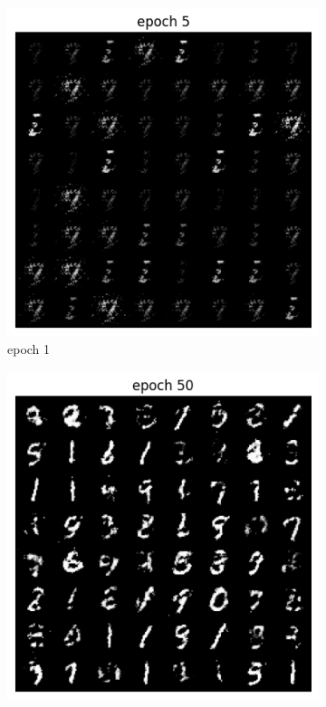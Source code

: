 \documentclass[a4paper]{article}
\theoremstyle{definition}
\newenvironment{soln}{
	\leavevmode\color{blue}\ignorespaces
}{}
\begin{document}
\begin{enumerate} [label=(\alph*)]
\begin{soln}
		\begin{figure}[H]
			\centering
			\begin{subfigure}[b]{0.3\textwidth}
				\centering
				\includegraphics[width=\textwidth]{epoch_5_q3.png}
				\caption{epoch 1}
			\end{subfigure}
			\hfill
			\begin{subfigure}[b]{0.3\textwidth}
				\centering
				\includegraphics[width=\textwidth]{epoch_50_q3.png}

\end{subfigure}
\end{figure}
\end{soln}
\end{enumerate}
\end{document}
